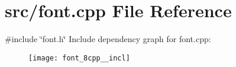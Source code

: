 \section{src/font.cpp File Reference}
\label{font_8cpp}
{\ttfamily \#include \char`\"{}font.\+h\char`\"{}}\newline
Include dependency graph for font.\+cpp\+:\nopagebreak
\begin{figure}[H]
\begin{center}
\leavevmode
\texttt{[image: font\_8cpp\_\_incl]}
\end{center}
\end{figure}
